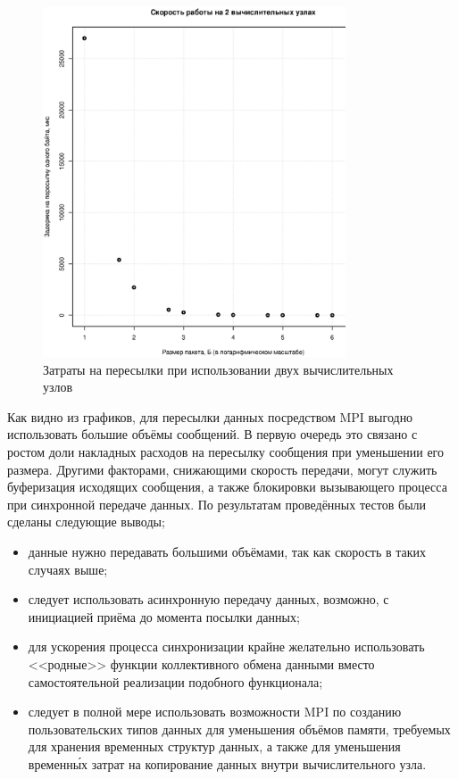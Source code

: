 \begin{figure}[htp]
\centering
\includegraphics[width=0.8\textwidth]{eps/mpi-2hosts.eps}
\caption{Затраты на пересылки при использовании двух вычислительных узлов}
\label{pic:mpi2hosts}
\end{figure}
Как видно из графиков, для пересылки данных посредством MPI выгодно использовать большие объёмы сообщений. В первую очередь это связано с ростом доли накладных расходов на пересылку сообщения при уменьшении его размера. Другими факторами, снижающими скорость передачи, могут служить буферизация исходящих сообщения, а также блокировки вызывающего процесса при синхронной передаче данных. По результатам проведённых тестов были сделаны следующие выводы;
\begin{itemize}
	\item данные нужно передавать большими объёмами, так как скорость в таких случаях выше;
	\item следует использовать асинхронную передачу данных, возможно, с инициацией приёма до момента посылки данных;
	\item для ускорения процесса синхронизации крайне желательно использовать <<родные>> функции коллективного обмена данными вместо самостоятельной реализации подобного функционала;
	\item следует в полной мере использовать возможности MPI по созданию пользовательских типов данных для уменьшения объёмов памяти, требуемых для хранения временных структур данных, а также для уменьшения временн\'{ы}х затрат на копирование данных внутри вычислительного узла.
\end{itemize}

